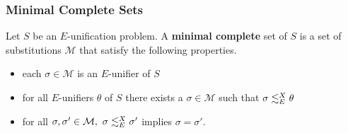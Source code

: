 \begin{frame}
\frametitle{Minimal Complete Sets}
Let $S$ be an $E$-unification problem. A \textbf{minimal complete} set of $S$ is a set of substitutions $\mathcal{M}$ that satisfy the following properties.

\begin{itemize}
\setlength{\itemsep}{9pt}
	\item each $\sigma \in \mathcal{M}$ is an $E$-unifier of $S$
	\item for all $E$-unifiers $\theta$ of $S$ there exists a $\sigma \in \mathcal{M}$ such that $\sigma\lesssim^X_E\theta$
	\item for all $\sigma,\sigma'\in\mathcal{M},\ \sigma\moreGeneral\sigma'$ implies $\sigma=\sigma'$.
\end{itemize}
\end{frame}
